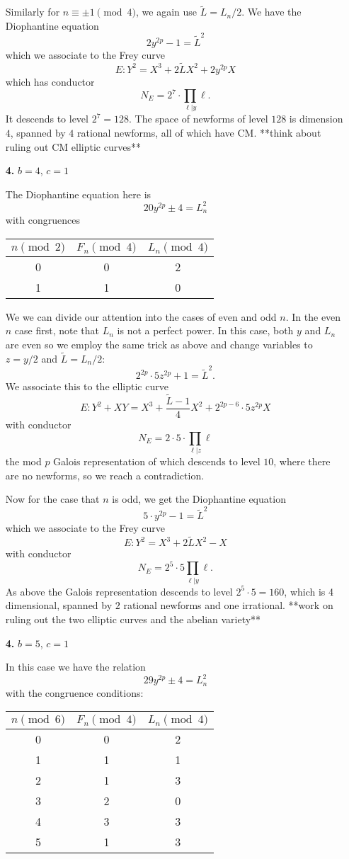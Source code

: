 \documentclass[12pt]{article}
\begin{document}
\begin{enumerate}
Similarly for $ n \equiv \pm 1 \pmod{4}$, we again use $\tilde{L} = L_n/2$.  We have the Diophantine equation
\[ 2y^{2p} -1 = \tilde{L}^2 \] 
which we associate to the Frey curve
\[ E: Y^2 = X^3 + 2\tilde{L}X^2+2y^{2p}X \]
which has conductor
\[N_E = 2^7 \cdot \prod_{\ell |y} \ell. \]
It descends to level $2^7 = 128$.  The space of newforms of level $128$ is dimension $4$, spanned by $4$ rational newforms, all of which have CM.  **think about ruling out CM elliptic curves**


\item[\textbf{4.}] $b = 4$, $c = 1$

The Diophantine equation here is 
\[ 20y^{2p} \pm4 = L_n^2\]
with congruences
\begin{center}
\begin{tabular}{c| c c}
$n \pmod{2}$ & $F_n \pmod{4}$ & $L_n \pmod{4}$ \\ \hline \hline
0 & 0 & 2 \\
1 & 1 &  0 \\ \hline \hline
\end{tabular}
\end{center}

We we can divide our attention into the cases of even and odd $n$.  In the even $n$ case first, note that $L_n$ is not a perfect power.  In this case, both $y$ and $L_n$ are even so we employ the same trick as above and change variables to $z = y/2$ and $\tilde{L} =  L_n/2$:
\[ 2^{2p} \cdot 5 z^{2p} + 1 = \tilde{L}^2. \]
We associate this to the elliptic curve 
\[ E: Y^2 + XY = X^3 + \frac{\tilde{L} -1}{4} X^2 + 2^{2p-6} \cdot 5 z^{2p} X \]
with conductor
\[N_E = 2 \cdot 5 \cdot \prod_{\ell | z} \ell \]
the mod $p$ Galois representation of which descends to level $10$, where there are no newforms, so we reach a contradiction.

Now for the case that $n$ is odd, we get the Diophantine equation
\[ 5 \cdot y^{2p} -1 = \tilde{L}^2 \]
which we associate to the Frey curve
\[ E: Y^2 = X^3 + 2\tilde{L} X^2 - X \]
with conductor
\[N_E = 2^5\cdot 5 \prod_{\ell | y} \ell. \]
As above the Galois representation descends to level $2^5 \cdot 5 = 160$, which is 4 dimensional, spanned by $2$ rational newforms and one irrational. **work on ruling out the two elliptic curves and the abelian variety**


\item[\textbf{4.}] $b = 5$, $c = 1$

In this case we have the relation 
\[ 29y^{2p} \pm 4 = L_n^2 \]
with the congruence conditions:
\begin{center}
\begin{tabular}{c| c c}
$n \pmod{6}$ & $F_n \pmod{4}$ & $L_n \pmod{4}$ \\ \hline \hline
0 & 0 & 2 \\
1 & 1 &  1 \\
2 & 1 & 3 \\
3 & 2 & 0 \\
4 & 3 & 3 \\
5 & 1 & 3  \\ \hline \hline
\end{tabular}
\end{center}


\end{enumerate}
\end{document}
